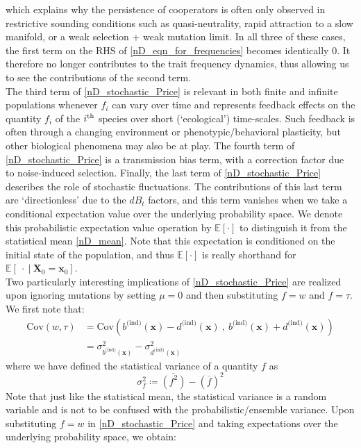 which explains why the persistence of cooperators is often only observed in restrictive sounding conditions such as quasi-neutrality, rapid attraction to a slow manifold, or a weak selection + weak mutation limit. In all three of these cases, the first term on the RHS of \eqref{nD_eqn_for_frequencies} becomes identically 0. It therefore no longer contributes to the trait frequency dynamics, thus allowing us to see the contributions of the second term.\\
The third term of \eqref{nD_stochastic_Price} is relevant in both finite and infinite populations whenever $f_i$ can vary over time and represents feedback effects on the quantity $f_i$ of the $i\textsuperscript{th}$ species over short (`ecological') time-scales. Such feedback is often through a changing environment or phenotypic/behavioral plasticity, but other biological phenomena may also be at play. The fourth term of \eqref{nD_stochastic_Price} is a transmission bias term, with a correction factor due to noise-induced selection. Finally, the last term of \eqref{nD_stochastic_Price} describes the role of stochastic fluctuations. The contributions of this last term are `directionless' due to the $dB_t$ factors, and this term vanishes when we take a conditional expectation value over the underlying probability space. We denote this probabilistic expectation value operation by $\mathbb{E}[\cdot]$ to distinguish it from the statistical mean \eqref{nD_mean}. Note that this expectation is conditioned on the initial state of the population, and thus $\mathbb{E}[\cdot]$ is really shorthand for $\mathbb{E}[\ \cdot \ | \ \mathbf{X}_0 = \mathbf{x}_0]$.
\\
Two particularly interesting implications of \eqref{nD_stochastic_Price} are realized upon ignoring mutations by setting $\mu = 0$ and then substituting $f=w$ and $f = \tau$. We first note that:
\begin{align}
\textrm{Cov}(w,\tau) &=\textrm{Cov}\left( b^{\textrm{(ind)}}(\mathbf{x}) - d^{\textrm{(ind)}}(\mathbf{x}) \ , \   b^{\textrm{(ind)}}(\mathbf{x}) + d^{\textrm{(ind)}}(\mathbf{x})\right)\\
&= \sigma^2_{b^{\textrm{(ind)}}(\mathbf{x})} - \sigma^2_{d^{\textrm{(ind)}}(\mathbf{x})}\label{nD_cross_covariance}
\end{align}
where we have defined the statistical variance of a quantity $f$ as
\begin{equation}
\sigma^2_{f} \coloneqq \overline{(f^2)} - (\overline{f})^2
\end{equation}
Note that just like the statistical mean, the statistical variance is a random variable and is not to be confused with the probabilistic/ensemble variance. Upon substituting $f = w$ in \eqref{nD_stochastic_Price} and taking expectations over the underlying probability space, we obtain:
